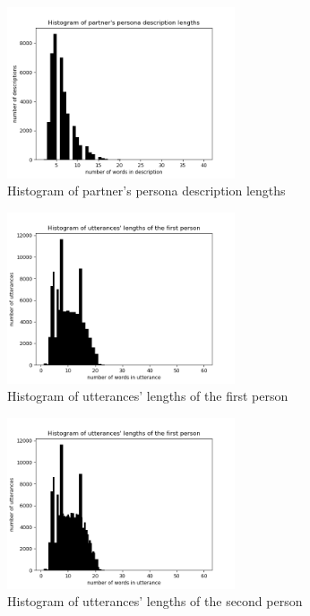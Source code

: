 \begin{figure}[hbt]
  \centering
  \includegraphics[width=0.6\textwidth]{figures/partner_desc.png}
  \caption{Histogram of partner's persona description lengths}
  \label{histogram_partner_desc}
\end{figure}

\begin{figure}[hbt]
  \centering
  \includegraphics[width=0.6\textwidth]{figures/uttr1_length.png}
  \caption{Histogram of utterances' lengths of the first person}
  \label{histogram_uttr1_length}
\end{figure}

\begin{figure}[hbt]
  \centering
  \includegraphics[width=0.6\textwidth]{figures/uttr2_length.png}
  \caption{Histogram of utterances' lengths of the second person}
  \label{histogram_uttr2_length}
\end{figure}

